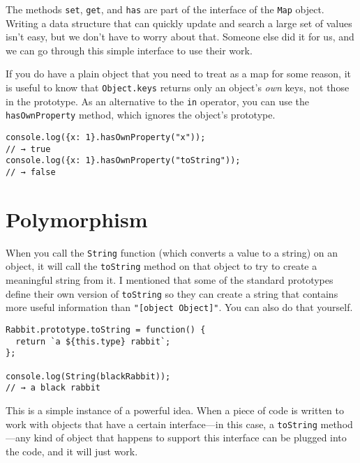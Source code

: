 The methods \lstinline`set`, \lstinline`get`, and \lstinline`has` are part of the interface of the \lstinline`Map` object. Writing a data structure that can quickly update and search a large set of values isn't easy, but we don't have to worry about that. Someone else did it for us, and we can go through this simple interface to use their work.

If you do have a plain object that you need to treat as a map for some reason, it is useful to know that \lstinline`Object.keys` returns only an object's \emph{own} keys, not those in the prototype. As an alternative to the \lstinline`in` operator, you can use the \lstinline`hasOwnProperty` method, which ignores the object's prototype.

\begin{lstlisting}
console.log({x: 1}.hasOwnProperty("x"));
// → true
console.log({x: 1}.hasOwnProperty("toString"));
// → false
\end{lstlisting}
\noindent

\section{Polymorphism}

When you call the \lstinline`String` function (which converts a value to a string) on an object, it will call the \lstinline`toString` method on that object to try to create a meaningful string from it. I mentioned that some of the standard prototypes define their own version of \lstinline`toString` so they can create a string that contains more useful information than \lstinline`"[object Object]"`. You can also do that yourself.

\begin{lstlisting}
Rabbit.prototype.toString = function() {
  return `a ${this.type} rabbit`;
};

console.log(String(blackRabbit));
// → a black rabbit
\end{lstlisting}
\noindent{}

This is a simple instance of a powerful idea. When a piece of code is written to work with objects that have a certain interface—in this case, a \lstinline`toString` method—any kind of object that happens to support this interface can be plugged into the code, and it will just work.


